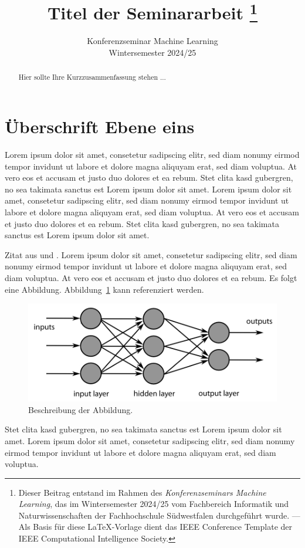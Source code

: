 \documentclass[a4paper, twoside]{IEEEtran}
\title{Titel der Seminararbeit
  \thanks{Dieser Beitrag entstand im Rahmen des \emph{Konferenzseminars Machine Learning}, das im Wintersemester 2024/25 vom Fachbereich Informatik und Naturwissenschaften der Fachhochschule Südwestfalen durchgeführt wurde. --- Als Basis für diese \LaTeX-Vorlage dient das IEEE Conference Template der IEEE Computational Intelligence Society.}}
\author{
  \IEEEauthorblockN{Ihr Name\\}
  \IEEEauthorblockA{Fachhochschule Südwestfalen}
  
  \vspace{3mm}
  Konferenzseminar Machine Learning\\
  Wintersemester 2024/25
}
\begin{document}
\maketitle

\begin{abstract}\null%
Hier sollte Ihre Kurzzusammenfassung stehen ... 
\end{abstract}

\section{Überschrift Ebene eins}

Lorem ipsum dolor sit amet, consetetur sadipscing elitr, sed diam nonumy eirmod tempor invidunt ut labore et dolore magna aliquyam erat, sed diam voluptua. At vero eos et accusam et justo duo dolores et ea rebum. Stet clita kasd gubergren, no sea takimata sanctus est Lorem ipsum dolor sit amet. Lorem ipsum dolor sit amet, consetetur sadipscing elitr, sed diam nonumy eirmod tempor invidunt ut labore et dolore magna aliquyam erat, sed diam voluptua. At vero eos et accusam et justo duo dolores et ea rebum. Stet clita kasd gubergren, no sea takimata sanctus est Lorem ipsum dolor sit amet.

Zitat aus \cite{scheme} und \cite[17]{knuth}. Lorem ipsum dolor sit amet, consetetur sadipscing elitr, sed diam nonumy eirmod tempor invidunt ut labore et dolore magna aliquyam erat, sed diam voluptua. At vero eos et accusam et justo duo dolores et ea rebum.
Es folgt eine Abbildung. Abbildung~\ref{abbildung1} kann referenziert werden.

\begin{figure}[htbp]
\centering
\includegraphics[width=\columnwidth]{deeplearning}
\caption{Beschreibung der Abbildung.}
\label{abbildung1}
\end{figure}

Stet clita kasd gubergren, no sea takimata sanctus est Lorem ipsum dolor sit amet. Lorem ipsum dolor sit amet, consetetur sadipscing elitr, sed diam nonumy eirmod tempor invidunt ut labore et dolore magna aliquyam erat, sed diam voluptua.
\end{document}
